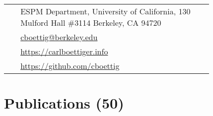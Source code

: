 \documentclass[10pt]{article} %
\begin{document}
\begin{paracol}{2}
\parbox[top][0.12\textheight][c]{\linewidth}{ %
	\vspace{-0.04\textheight} %
	\colorbox{shade}{ %
		\begin{supertabular}{p{0.05\linewidth}|p{0.775\linewidth}} %
			\raisebox{-1pt}{\faHome} & ESPM Department, University of California, 130 Mulford Hall \#3114 Berkeley, CA 94720 \\ %
			\raisebox{0pt}{\small\faEnvelope} & \href{mailto:cboettig@berkeley.eu}{cboettig@berkeley.edu} \\ %
			\raisebox{-1pt}{\small\faDesktop} & \href{https://carlboettiger.info}{https://carlboettiger.info} \\ %
			\raisebox{-1pt}{\faGithub} & \href{https://github.com/cboettig}{https://github.com/cboettig} \\ %
		\end{supertabular}
	}
}



\section{Publications (50)}




\end{paracol}
\end{document}
